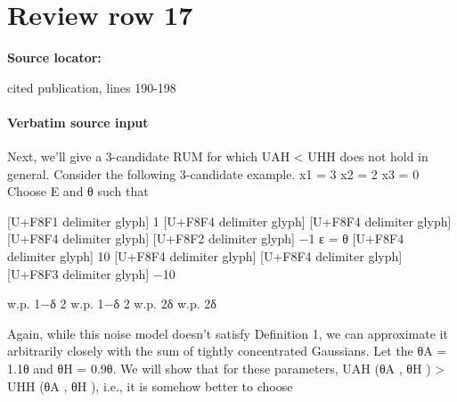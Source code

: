 \documentclass[10pt]{article}
\begin{document}
\section*{Review row 17}
\textbf{Source locator:} {\footnotesize\raggedright cited publication, lines 190-\allowbreak{}198\par}
\paragraph{Verbatim source input}
\begin{ReviewVerbatim}
Next, we’ll give a 3-candidate RUM for which UAH < UHH does not hold in general. Consider the following
3-candidate example.
x1 = 3
x2 = 2
x3 = 0
Choose E and θ such that

[U+F8F1 delimiter glyph]
1
[U+F8F4 delimiter glyph]
[U+F8F4 delimiter glyph]
[U+F8F4 delimiter glyph]
[U+F8F2 delimiter glyph]
−1
ε
=
θ [U+F8F4 delimiter glyph]
10
[U+F8F4 delimiter glyph]
[U+F8F4 delimiter glyph]
[U+F8F3 delimiter glyph]
−10

w.p. 1−δ
2
w.p. 1−δ
2
w.p. 2δ
w.p. 2δ

Again, while this noise model doesn’t satisfy Definition 1, we can approximate it arbitrarily closely with the
sum of tightly concentrated Gaussians. Let the θA = 1.1θ and θH = 0.9θ.
We will show that for these parameters, UAH (θA , θH ) > UHH (θA , θH ), i.e., it is somehow better to choose
\end{ReviewVerbatim}
\end{document}
